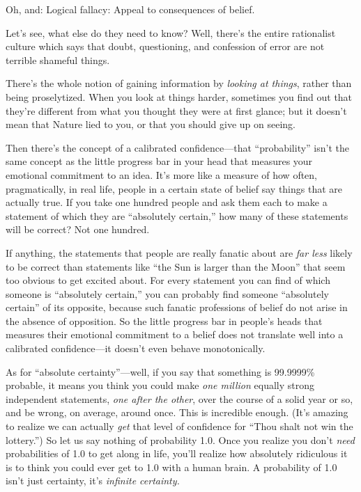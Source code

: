 {
 Oh, and: Logical fallacy: Appeal to consequences of belief.}

{
 Let's see, what else do they need to know? Well,
there's the entire rationalist culture which says that
doubt, questioning, and confession of error are not terrible shameful
things.}

{
 There's the whole notion of gaining information by
\textit{looking at things}, rather than being proselytized. When you
look at things harder, sometimes you find out that
they're different from what you thought they were at
first glance; but it doesn't mean that Nature lied to
you, or that you should give up on seeing.}

{
 Then there's the concept of a calibrated
confidence---that ``probability''
isn't the same concept as the little progress bar in
your head that measures your emotional commitment to an idea.
It's more like a measure of how often, pragmatically,
in real life, people in a certain state of belief say things that are
actually true. If you take one hundred people and ask them each to make
a statement of which they are ``absolutely
certain,'' how many of these statements will be
correct? Not one hundred.}

{
 If anything, the statements that people are really fanatic about
are \textit{far less} likely to be correct than statements like
``the Sun is larger than the Moon''
that seem too obvious to get excited about. For every statement you can
find of which someone is ``absolutely
certain,'' you can probably find someone
``absolutely certain'' of its
opposite, because such fanatic professions of belief do not arise in
the absence of opposition. So the little progress bar in
people's heads that measures their emotional commitment
to a belief does not translate well into a calibrated confidence---it
doesn't even behave monotonically.}

{
 As for ``absolute
certainty''---well, if you say that something is
99.9999\% probable, it means you think you could make \textit{one
million} equally strong independent statements, \textit{one after the
other}, over the course of a solid year or so, and be wrong, on
average, around once. This is incredible enough. (It's
amazing to realize we can actually \textit{get} that level of
confidence for ``Thou shalt not win the
lottery.'') So let us say nothing of probability 1.0.
Once you realize you don't \textit{need} probabilities
of 1.0 to get along in life, you'll realize how
absolutely ridiculous it is to think you could ever get to 1.0 with a
human brain. A probability of 1.0 isn't just certainty,
it's \textit{infinite certainty.}}

